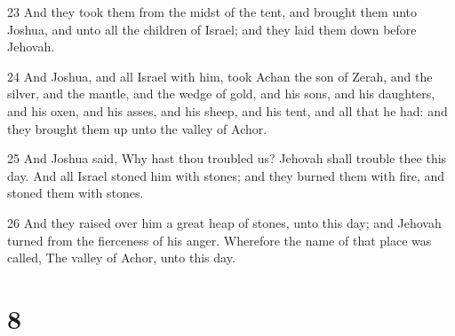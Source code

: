 \par 23 And they took them from the midst of the tent, and brought them unto Joshua, and unto all the children of Israel; and they laid them down before Jehovah.
\par 24 And Joshua, and all Israel with him, took Achan the son of Zerah, and the silver, and the mantle, and the wedge of gold, and his sons, and his daughters, and his oxen, and his asses, and his sheep, and his tent, and all that he had: and they brought them up unto the valley of Achor.
\par 25 And Joshua said, Why hast thou troubled us? Jehovah shall trouble thee this day. And all Israel stoned him with stones; and they burned them with fire, and stoned them with stones.
\par 26 And they raised over him a great heap of stones, unto this day; and Jehovah turned from the fierceness of his anger. Wherefore the name of that place was called, The valley of Achor, unto this day.

\chapter{8}

